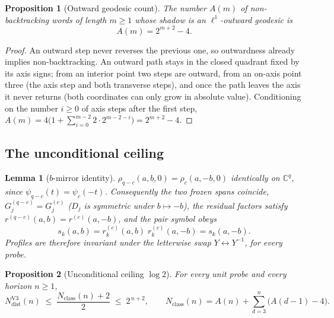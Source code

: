 \documentclass[11pt]{article}
\newtheorem{lemma}{Lemma}
\newtheorem{proposition}{Proposition}
\newcommand{\NdistV}{N^{\mathrm{V3}}_{\mathrm{dist}}}
\newcommand{\Nclass}{N_{\mathrm{class}}}
\begin{document}
\begin{proposition}[Outward geodesic count]
\label{prop:outward-count}
The number $A(m)$ of non-backtracking words of length $m\ge1$ whose shadow is an $\ell^1$-outward geodesic
is
\[
A(m)=2^{m+2}-4 .
\]
\end{proposition}

\begin{proof}
An outward step never reverses the previous one, so outwardness already implies non-backtracking.
An outward path stays in the closed quadrant fixed by its axis signs; from an interior point two steps are
outward, from an on-axis point three (the axis step and both transverse steps), and once the path leaves the
axis it never returns (both coordinates can only grow in absolute value).
Conditioning on the number $i\ge0$ of axis steps after the first step,
$A(m)=4\bigl(1+\sum_{i=0}^{m-2}2\cdot2^{m-2-i}\bigr)=2^{m+2}-4$.
\end{proof}

\subsection{The unconditional ceiling}
\label{sec:v3-ceiling}

\begin{lemma}[$b$-mirror identity]
\label{lem:b-mirror}
$\rho_{q-c}(a,b,0)=\rho_c(a,-b,0)$ identically on $\mathbb{C}^q$, since $\psi_{q-c}(t)=\psi_c(-t)$.
Consequently the two frozen spans coincide, $G^{(q-c)}_j=G^{(c)}_j$ ($D_j$ is symmetric under
$b\mapsto-b$), the residual factors satisfy $r^{(q-c)}(a,b)=r^{(c)}(a,-b)$, and the pair symbol obeys
\[
s_k(a,b)=r^{(c)}_k(a,b)\;r^{(c)}_k(a,-b)=s_k(a,-b).
\]
Profiles are therefore invariant under the letterwise swap $Y\leftrightarrow Y^{-1}$, for every probe.
\end{lemma}

\begin{proposition}[Unconditional ceiling $\log 2$]
\label{prop:class-bound}
For every unit probe and every horizon $n\ge1$,
\[
\NdistV(n)\;\le\;\frac{\Nclass(n)+2}{2}\;\le\;2^{\,n+2},
\qquad
\Nclass(n)=A(n)+\sum_{d=3}^{n}\bigl(A(d-1)-4\bigr).
\]
\end{proposition}
\end{document}
